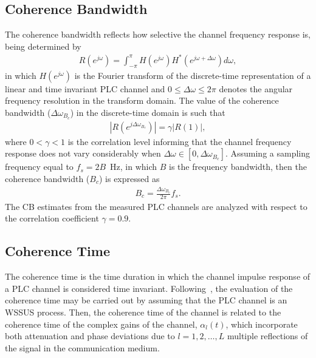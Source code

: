 \documentclass[journal]{IEEEtran}
\begin{document}
\subsection{Coherence Bandwidth}
The coherence bandwidth reflects how selective the channel frequency response is, being determined by
\begin{eqnarray}
	R(e^{j\omega})=\int_{-\pi}^{\pi} H(e^{j\omega})H^*(e^{j\omega+\Delta\omega})d \omega,
	\label{eq:CB}
\end{eqnarray}
in which $H(e^{j\omega})$ is the Fourier transform of the discrete-time representation of a linear and time invariant PLC channel and  $0 \leq \Delta \omega \leq 2\pi$ denotes the angular frequency resolution in the transform domain. The value of the coherence bandwidth ($\Delta \omega_{B_c}$) in the discrete-time domain is such that
\begin{eqnarray}
|R(e^{j\Delta \omega_{B_c}})|=\gamma|R(1)|,
\label{eq:CB}
\end{eqnarray}
where $0<\gamma<1$ is the correlation level informing that the channel frequency response does not vary considerably when $\Delta \omega \in [0,\Delta \omega_{B_c}]$. Assuming a sampling frequency equal to $f_s=2B$~Hz, in which $B$ is the frequency bandwidth, then the coherence bandwidth ($B_c$) is expressed as
\begin{eqnarray}
B_c=\frac{\Delta \omega_{B_c}}{2\pi}f_s.
\label{eq:CB}
\end{eqnarray}
The CB estimates from the measured PLC channels are analyzed with respect to the correlation coefficient $\gamma = 0.9$. 

\subsection{Coherence Time}
The coherence time is the time duration in which the channel impulse response of a PLC channel is considered time invariant. Following~\cite{Picorone2014}, the evaluation of the coherence time may be carried out by assuming that the PLC channel is an \ac{WSSUS} process. Then, the coherence time of the channel is related to the coherence time of the complex gains of the channel, $\alpha_l(t)$, which incorporate both attenuation and phase deviations due to $l = 1,2,\ldots,L$ multiple reflections of the signal in the communication medium.  
\end{document}
